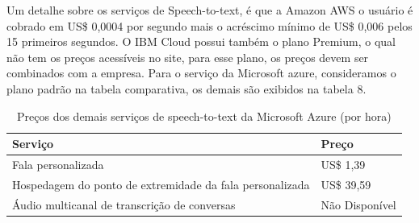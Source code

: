 \documentclass{article}
\begin{document}
Um detalhe sobre os serviços de Speech-to-text, é que a Amazon AWS o usuário é cobrado em US\$ 0,0004 por segundo mais o acréscimo mínimo de US\$ 0,006 pelos 15 primeiros segundos. O IBM Cloud possui também o plano Premium, o qual não tem os preços acessíveis no site, para esse plano, os preços devem ser combinados com a empresa. Para o serviço da Microsoft azure, consideramos o plano padrão na tabela comparativa, os demais são exibidos na tabela 8.

\begin{table}[!!ht]
 \caption{Preços dos demais serviços de speech-to-text da Microsoft Azure (por hora)}
  \centering
  \begin{tabular}{ll}
    \cmidrule(r){1-2}
    Serviço & Preço \\
    \midrule
    Fala personalizada & US\$ 1,39\\ %
    Hospedagem do ponto de extremidade da fala personalizada & US\$ 39,59 \\ %
    Áudio multicanal de transcrição de conversas & Não Disponível \\
    \bottomrule
  \end{tabular}
  \label{tab:table10}
\end{table}
\end{document}
